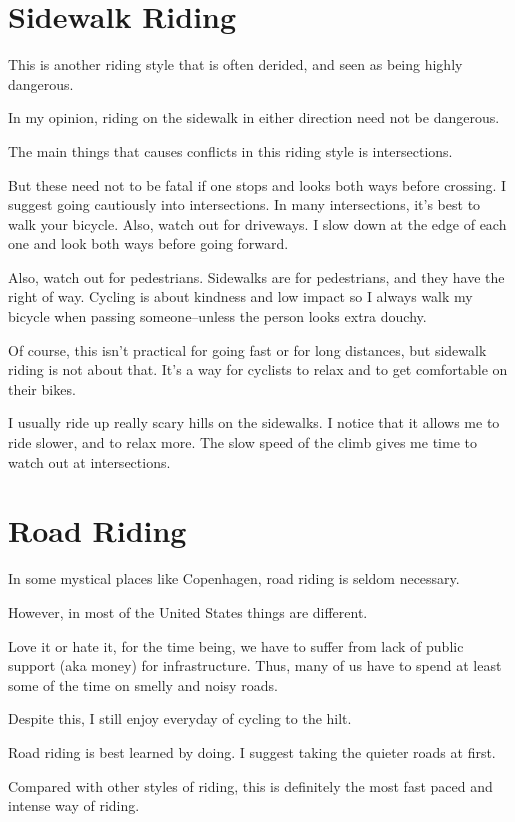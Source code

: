 \section{Sidewalk Riding}

This is another riding style that is often derided, and seen as being highly dangerous.

In my opinion, riding on the sidewalk in either direction need not be dangerous.

The main things that causes conflicts in this riding style is intersections.

But these need not to be fatal if one stops and looks both ways before
crossing. I suggest going cautiously into intersections. In many intersections,
it's best to walk your bicycle. Also, watch out for driveways. I slow down at
the edge of each one and look both ways before going forward.

Also, watch out for pedestrians. Sidewalks are for  pedestrians, and they have
the right of way. Cycling is about kindness and low impact so I always walk my
bicycle when passing someone--unless the person looks extra douchy. 

Of course, this isn't practical for going fast or for long distances, but
sidewalk riding is not about that. It's a way for cyclists to relax and to get
comfortable on their bikes.  

I usually ride up really scary hills on the sidewalks. I notice that it allows
me to ride slower, and to relax more. The slow speed of the climb gives me time
to watch out at intersections.

\section{Road Riding}

In some mystical places like Copenhagen, road riding is seldom necessary. 

However, in most of the United States things are different.

Love it or hate it, for the time being, we have to suffer from lack of public
support (aka money) for infrastructure. Thus, many of us have to spend at least
some of the time on smelly and noisy roads.

Despite this, I still enjoy everyday of cycling to the hilt. 

Road riding is best learned by doing. I suggest taking the quieter roads at first.

Compared with other styles of riding, this is definitely the most fast paced
and intense way of riding. 

